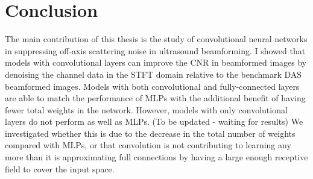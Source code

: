 \chapter{Conclusion}
The main contribution of this thesis is the study of convolutional neural networks in suppressing off-axis scattering noise in ultrasound beamforming. I showed that models with convolutional layers can improve the CNR in beamformed images by denoising the channel data in the STFT domain relative to the benchmark DAS beamformed images. Models with both convolutional and fully-connected layers are able to match the performance of MLPs with the additional benefit of having fewer total weights in the network. However, models with only convolutional layers do not perform as well as MLPs. (To be updated - waiting for results) We investigated whether this is due to the decrease in the total number of weights compared with MLPs, or that convolution is not contributing to learning any more than it is approximating full connections by having a large enough receptive field to cover the input space. %
